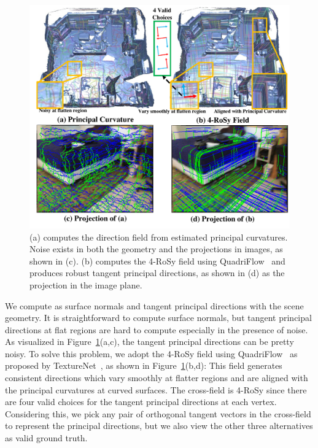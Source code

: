 \begin{figure}
    \centering
    \includegraphics[width=0.8\linewidth,height=0.584\linewidth]{FrameNet/graph/4rosy.pdf}
    \vspace{-0.20in}
    \caption{(a) computes the direction field from estimated principal curvatures. Noise exists in both the geometry and the projections in images, as shown in (c). (b) computes the 4-RoSy field using QuadriFlow~\cite{huang2018quadriflow} and produces robust tangent principal directions, as shown in (d) as the projection in the image plane.}
    \label{fig:framenet-vis-geometry}
\vspace{-0.1in}
\end{figure}

We compute \cframe{} as surface normals and tangent principal directions with the scene geometry. It is straightforward to compute surface normals, but tangent principal directions at flat regions are hard to compute especially in the presence of noise. As visualized in Figure~\ref{fig:framenet-vis-geometry}(a,c), the tangent principal directions can be pretty noisy. To solve this problem, we adopt the 4-RoSy field using QuadriFlow~\cite{huang2018quadriflow} as proposed by TextureNet~\cite{huang2018texturenet}, as shown in Figure~\ref{fig:framenet-vis-geometry}(b,d): This field generates consistent directions which vary smoothly at flatter regions and are aligned with the principal curvatures at curved surfaces. The cross-field is 4-RoSy since there are four valid choices for the tangent principal directions at each vertex. Considering this, we pick any pair of orthogonal tangent vectors in the cross-field to represent the principal directions, but we also view the other three alternatives as valid ground truth.

